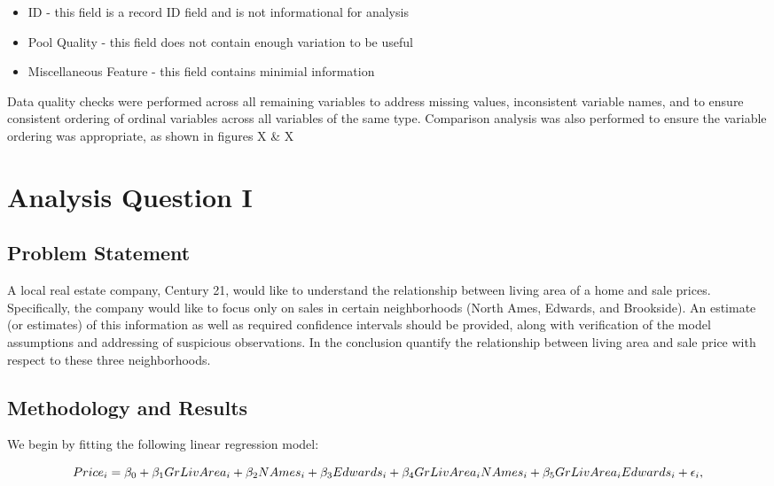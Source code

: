 \documentclass[american,]{article}
\providecommand{\tightlist}{%
  \setlength{\itemsep}{0pt}\setlength{\parskip}{0pt}}
\begin{document}
\begin{itemize}
\tightlist
\item
  ID - this field is a record ID field and is not informational for
  analysis
\item
  Pool Quality - this field does not contain enough variation to be
  useful
\item
  Miscellaneous Feature - this field contains minimial information
\end{itemize}

Data quality checks were performed across all remaining variables to
address missing values, inconsistent variable names, and to ensure
consistent ordering of ordinal variables across all variables of the
same type. Comparison analysis was also performed to ensure the variable
ordering was appropriate, as shown in figures X \& X

\section{Analysis Question I}\label{analysis-question-i}

\subsection{Problem Statement}\label{problem-statement}

A local real estate company, Century 21, would like to understand the
relationship between living area of a home and sale prices.
Specifically, the company would like to focus only on sales in certain
neighborhoods (North Ames, Edwards, and Brookside). An estimate (or
estimates) of this information as well as required confidence intervals
should be provided, along with verification of the model assumptions and
addressing of suspicious observations. In the conclusion quantify the
relationship between living area and sale price with respect to these
three neighborhoods.

\subsection{Methodology and Results}\label{methodology-and-results}

We begin by fitting the following linear regression model:

\begin{equation}
Price_i = {\beta_0} + {\beta_1}GrLivArea_{i} + {\beta_2}NAmes_{i} + {\beta_3}Edwards_{i} + {\beta_4}GrLivArea_{i}\*NAmes_{i}
+ {\beta_5}GrLivArea_{i}\*Edwards_{i}
+ {\epsilon_i},
\end{equation}
\end{document}
